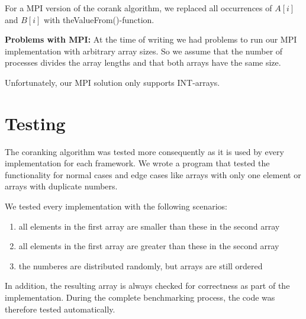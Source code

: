 For a MPI version of the corank algorithm, we replaced all occurrences of $A[i]$ and $B[i]$ with theValueFrom()-function.


\textbf{Problems with MPI:}
At the time of writing we had problems to run our MPI implementation with arbitrary array sizes.
So we assume that the number of processes divides the array lengths and that both arrays have the same size.

Unfortunately, our MPI solution only supports INT-arrays.

\section{Testing}
The coranking algorithm was tested more consequently as it is used by every implementation for each framework. We wrote a program that tested the functionality for normal cases and edge cases like arrays with only one element or arrays with duplicate numbers.

We tested every implementation with the following scenarios:
\begin{enumerate}
  \item all elements in the first array are smaller than these in the second array
  \item all elements in the first array are greater than these in the second array
  \item the numberes are distributed randomly, but arrays are still ordered
\end{enumerate}
In addition, the resulting array is always checked for correctness as part of the implementation.
During the complete benchmarking process, the code was therefore tested automatically.


